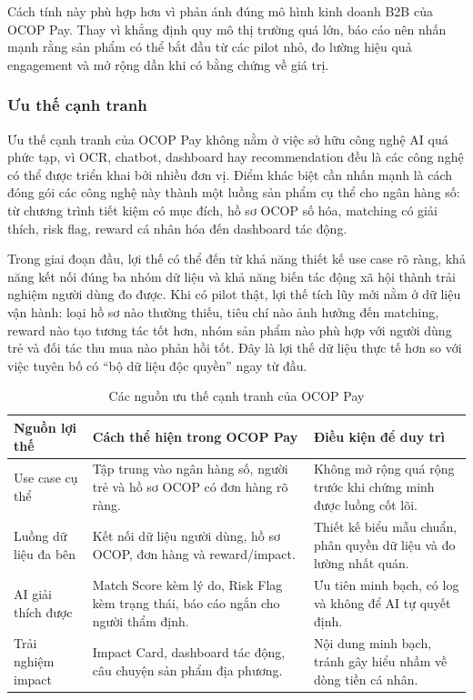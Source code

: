 \documentclass[13pt,a4paper]{extarticle}
\begin{document}
Cách tính này phù hợp hơn vì phản ánh đúng mô hình kinh doanh B2B của OCOP Pay. Thay vì khẳng định quy mô thị trường quá lớn, báo cáo nên nhấn mạnh rằng sản phẩm có thể bắt đầu từ các pilot nhỏ, đo lường hiệu quả engagement và mở rộng dần khi có bằng chứng về giá trị.

\subsubsection{Ưu thế cạnh tranh}

Ưu thế cạnh tranh của OCOP Pay không nằm ở việc sở hữu công nghệ AI quá phức tạp, vì OCR, chatbot, dashboard hay recommendation đều là các công nghệ có thể được triển khai bởi nhiều đơn vị. Điểm khác biệt cần nhấn mạnh là cách đóng gói các công nghệ này thành một luồng sản phẩm cụ thể cho ngân hàng số: từ chương trình tiết kiệm có mục đích, hồ sơ OCOP số hóa, matching có giải thích, risk flag, reward cá nhân hóa đến dashboard tác động.

Trong giai đoạn đầu, lợi thế có thể đến từ khả năng thiết kế use case rõ ràng, khả năng kết nối đúng ba nhóm dữ liệu và khả năng biến tác động xã hội thành trải nghiệm người dùng đo được. Khi có pilot thật, lợi thế tích lũy mới nằm ở dữ liệu vận hành: loại hồ sơ nào thường thiếu, tiêu chí nào ảnh hưởng đến matching, reward nào tạo tương tác tốt hơn, nhóm sản phẩm nào phù hợp với người dùng trẻ và đối tác thu mua nào phản hồi tốt. Đây là lợi thế dữ liệu thực tế hơn so với việc tuyên bố có ``bộ dữ liệu độc quyền'' ngay từ đầu.

\begin{table}[H]
\centering
\caption{Các nguồn ưu thế cạnh tranh của OCOP Pay}
\begin{tabular}{|p{3cm}|p{6cm}|p{6cm}|}
\hline
\textbf{Nguồn lợi thế} & \textbf{Cách thể hiện trong OCOP Pay} & \textbf{Điều kiện để duy trì} \\
\hline
Use case cụ thể & Tập trung vào ngân hàng số, người trẻ và hồ sơ OCOP có đơn hàng rõ ràng. & Không mở rộng quá rộng trước khi chứng minh được luồng cốt lõi. \\
\hline
Luồng dữ liệu đa bên & Kết nối dữ liệu người dùng, hồ sơ OCOP, đơn hàng và reward/impact. & Thiết kế biểu mẫu chuẩn, phân quyền dữ liệu và đo lường nhất quán. \\
\hline
AI giải thích được & Match Score kèm lý do, Risk Flag kèm trạng thái, báo cáo ngắn cho người thẩm định. & Ưu tiên minh bạch, có log và không để AI tự quyết định. \\
\hline
Trải nghiệm impact & Impact Card, dashboard tác động, câu chuyện sản phẩm địa phương. & Nội dung minh bạch, tránh gây hiểu nhầm về dòng tiền cá nhân. \\
\hline
\end{tabular}
\end{table}
\end{document}
